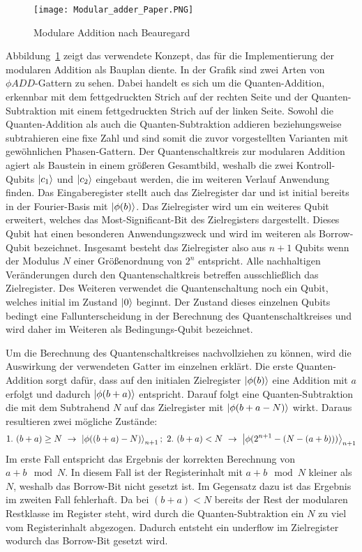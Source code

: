 \begin{figure}[H]
  \caption{Modulare Addition nach Beauregard~\cite{beauregard2003circuit}}
  \label{fig:modulare_addition_paper}
  \texttt{[image: Modular\_adder\_Paper.PNG]}
  \centering
  \end{figure}
Abbildung~\ref{fig:modulare_addition_paper} zeigt das verwendete Konzept, 
das für die Implementierung der modularen Addition als Bauplan diente.
In der Grafik sind zwei Arten von \(\phi ADD\)-Gattern zu sehen.
Dabei handelt es sich um die Quanten-Addition, erkennbar mit dem fettgedruckten Strich auf der rechten Seite und 
der Quanten-Subtraktion mit einem fettgedruckten Strich auf der linken Seite.
Sowohl die Quanten-Addition als auch die Quanten-Subtraktion addieren beziehungsweise subtrahieren eine fixe Zahl und 
sind somit die zuvor vorgestellten Varianten mit gewöhnlichen Phasen-Gattern.
Der Quantenschaltkreis zur modularen Addition agiert als Baustein in einem größeren Gesamtbild, 
weshalb die zwei Kontroll-Qubits \(\ket{c_1}\) und \(\ket{c_2}\) eingebaut werden, 
die im weiteren Verlauf Anwendung finden.
Das Eingaberegister stellt auch das Zielregister dar und 
ist initial bereits in der Fourier-Basis mit \(\ket{\phi(b)}\).
Das Zielregister wird um ein weiteres Qubit erweitert, 
welches das Most-Significant-Bit des Zielregisters dargestellt.
Dieses Qubit hat einen besonderen Anwendungszweck und wird im weiteren als Borrow-Qubit bezeichnet.
Insgesamt besteht das Zielregister also aus \(n+1\) Qubits wenn der Modulus \(N\) einer Größenordnung von \(2^n\) entspricht.
Alle nachhaltigen Veränderungen durch den Quantenschaltkreis betreffen ausschließlich das Zielregister.
Des Weiteren verwendet die Quantenschaltung noch ein Qubit, welches initial im Zustand \(\ket{0}\) beginnt.
Der Zustand dieses einzelnen Qubits bedingt eine Fallunterscheidung in der Berechnung des Quantenschaltkreises und 
wird daher im Weiteren als Bedingungs-Qubit bezeichnet. 

Um die Berechnung des Quantenschaltkreises nachvollziehen zu können, 
wird die Auswirkung der verwendeten Gatter im einzelnen erklärt.
Die erste Quanten-Addition sorgt dafür, 
dass auf den initialen Zielregister \(\ket{\phi(b)}\) eine Addition mit \(a\) erfolgt und 
dadurch \(\ket{\phi(b + a)}\) entspricht.
Darauf folgt eine Quanten-Subtraktion die mit dem Subtrahend \(N\) auf das Zielregister mit
\(\ket{\phi(b + a - N)}\) wirkt. 
Daraus resultieren zwei mögliche Zustände:
\[1.~(b+a) \geq N~\rightarrow~\ket{\phi((b+a) - N)}_{n+1};~2.~
(b+a) < N~\rightarrow~\ket{\phi(2^{n+1}-(N-(a+b)))}_{n+1}
  \]
Im erste Fall entspricht das Ergebnis der korrekten Berechnung von \(a+b \mod N\).
In diesem Fall ist der Registerinhalt mit \(a+b \mod N\) kleiner als \(N\), 
weshalb das Borrow-Bit nicht gesetzt ist.
Im Gegensatz dazu ist das Ergebnis im zweiten Fall fehlerhaft.
Da bei \((b+a) < N\) bereits der Rest der modularen Restklasse im Register steht, 
wird durch die Quanten-Subtraktion ein \(N\) zu viel vom Registerinhalt abgezogen.
Dadurch entsteht ein underflow im Zielregister wodurch das Borrow-Bit gesetzt wird.

